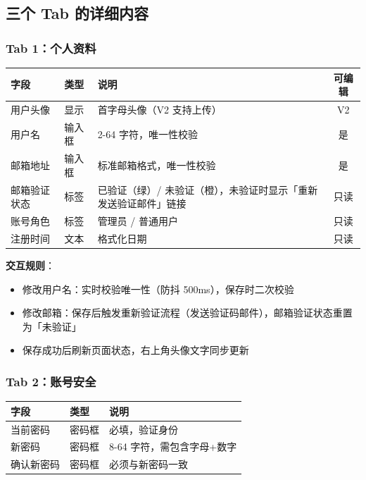\documentclass[11pt,a4paper]{article}
\begin{document}
\subsection{三个 Tab 的详细内容}

\subsubsection{Tab 1：个人资料}

\begin{table}[h]
\centering
\small
\begin{tabular}{llp{5cm}c}
\toprule
\textbf{字段} & \textbf{类型} & \textbf{说明} & \textbf{可编辑} \\
\midrule
用户头像 & 显示 & 首字母头像（V2 支持上传） & V2 \\
用户名 & 输入框 & 2-64 字符，唯一性校验 & 是 \\
邮箱地址 & 输入框 & 标准邮箱格式，唯一性校验 & 是 \\
邮箱验证状态 & 标签 & 已验证（绿）/ 未验证（橙），未验证时显示「重新发送验证邮件」链接 & 只读 \\
账号角色 & 标签 & 管理员 / 普通用户 & 只读 \\
注册时间 & 文本 & 格式化日期 & 只读 \\
\bottomrule
\end{tabular}
\end{table}

\textbf{交互规则}：
\begin{itemize}[nosep]
  \item 修改用户名：实时校验唯一性（防抖 500ms），保存时二次校验
  \item 修改邮箱：保存后触发重新验证流程（发送验证码邮件），邮箱验证状态重置为「未验证」
  \item 保存成功后刷新页面状态，右上角头像文字同步更新
\end{itemize}

\subsubsection{Tab 2：账号安全}

\begin{table}[h]
\centering
\small
\begin{tabular}{llp{6cm}}
\toprule
\textbf{字段} & \textbf{类型} & \textbf{说明} \\
\midrule
当前密码 & 密码框 & 必填，验证身份 \\
新密码 & 密码框 & 8-64 字符，需包含字母+数字 \\
确认新密码 & 密码框 & 必须与新密码一致 \\
\bottomrule
\end{tabular}
\end{table}
\end{document}
